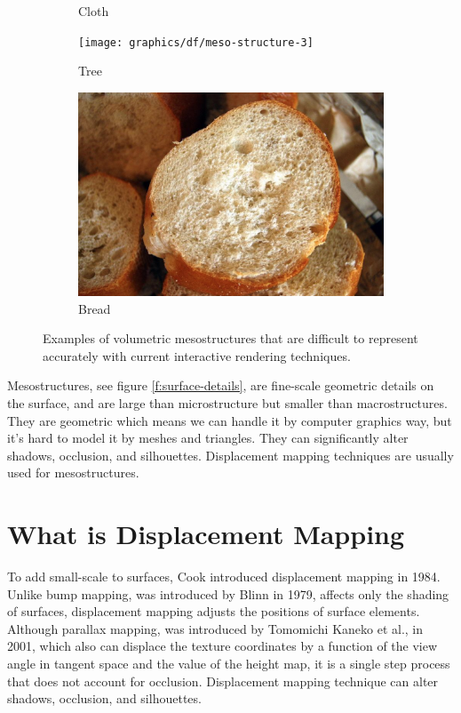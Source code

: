 \begin{figure}
\begin{subfigure}[t]{.285\textwidth}
		\caption{Cloth}
	\end{subfigure}
	\begin{subfigure}[t]{.23\textwidth}
		\texttt{[image: graphics/df/meso-structure-3]}
		\caption{Tree}
	\end{subfigure}
	\begin{subfigure}[t]{.26\textwidth}
		\includegraphics[width=1.0\textwidth]{graphics/df/meso-structure-4}
		\caption{Bread}
	\end{subfigure}
	\caption{Examples of volumetric mesostructures that are difficult to represent accurately with current interactive rendering techniques.}
\end{figure}

Mesostructures, see figure \ref{f:surface-details}, are fine-scale geometric details on the surface, and are large than microstructure but smaller than macrostructures. They are geometric which means we can handle it by computer graphics way, but it's hard to model it by meshes and triangles. They can significantly alter shadows, occlusion, and silhouettes. Displacement mapping techniques are usually used for mesostructures.



\section{What is Displacement Mapping}
To add small-scale to surfaces, Cook introduced displacement mapping in 1984\cite[-17mm]{a:Shade-Trees}. Unlike bump mapping, was introduced by Blinn in 1979\cite[-12mm]{a:SimulationofWrinkledSurfaces}, affects only the shading of surfaces, displacement mapping adjusts the positions of surface elements. Although parallax mapping, was introduced by Tomomichi Kaneko et al., in 2001\cite[-7mm]{a:DetailedShapeRepresentationwithParallaxMapping}, which also can displace the texture coordinates by a function of the view angle in tangent space and the value of the height map, it is a single step process that does not account for occlusion. Displacement mapping technique can alter shadows, occlusion, and silhouettes.

